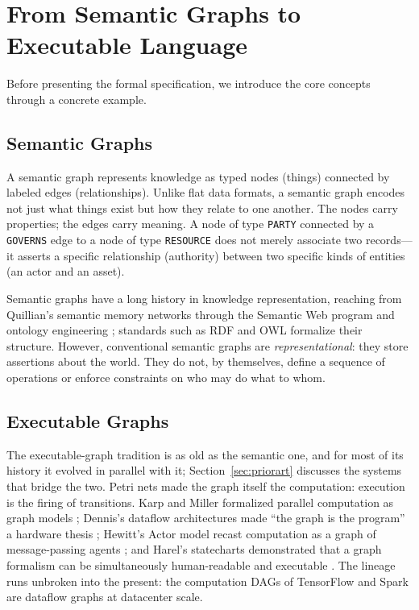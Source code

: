 \documentclass{article}
\begin{document}
\section{From Semantic Graphs to Executable Language}

Before presenting the formal specification, we introduce the core concepts through a concrete example.

\subsection{Semantic Graphs}

A semantic graph represents knowledge as typed nodes (things) connected by labeled edges (relationships). Unlike flat data formats, a semantic graph encodes not just what things exist but how they relate to one another. The nodes carry properties; the edges carry meaning. A node of type \texttt{PARTY} connected by a \texttt{GOVERNS} edge to a node of type \texttt{RESOURCE} does not merely associate two records---it asserts a specific relationship (authority) between two specific kinds of entities (an actor and an asset).

Semantic graphs have a long history in knowledge representation, reaching from Quillian's semantic memory networks \citep{quillian1968semantic} through the Semantic Web program \citep{berners2001semantic} and ontology engineering \citep{gruber1993translation}; standards such as RDF \citep{rdf2014} and OWL \citep{owl2012} formalize their structure. However, conventional semantic graphs are \textit{representational}: they store assertions about the world. They do not, by themselves, define a sequence of operations or enforce constraints on who may do what to whom.

\subsection{Executable Graphs}

The executable-graph tradition is as old as the semantic one, and for most of its history it evolved in parallel with it; Section~\ref{sec:priorart} discusses the systems that bridge the two. Petri nets \citep{petri1962kommunikation} made the graph itself the computation: execution is the firing of transitions. Karp and Miller formalized parallel computation as graph models \citep{karp1966properties}; Dennis's dataflow architectures made ``the graph is the program'' a hardware thesis \citep{dennis1975preliminary}; Hewitt's Actor model recast computation as a graph of message-passing agents \citep{hewitt1973universal}; and Harel's statecharts demonstrated that a graph formalism can be simultaneously human-readable and executable \citep{harel1987statecharts}. The lineage runs unbroken into the present: the computation DAGs of TensorFlow \citep{abadi2016tensorflow} and Spark \citep{zaharia2012resilient} are dataflow graphs at datacenter scale.
\end{document}
